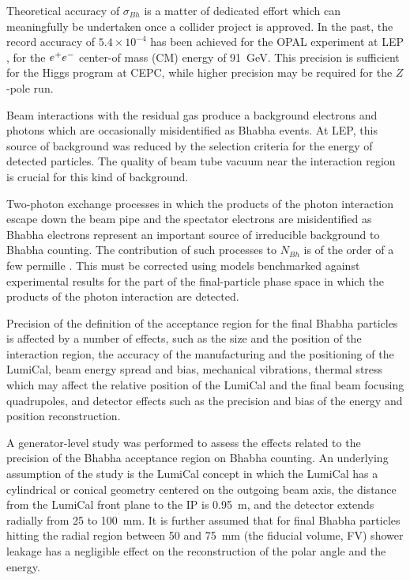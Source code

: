 Theoretical accuracy of $\sigma_{Bh}$ is a matter of dedicated effort which can meaningfully be undertaken once a collider project is approved. In the past, the record accuracy of $5.4\times10^{-4}$ has been achieved for the OPAL experiment at LEP \cite{opal2000}, for the $e^+ e^-$ center-of mass (CM) energy of 91~GeV. This precision is sufficient for the Higgs program at CEPC, while higher precision may be required for the $Z$-pole run.

Beam interactions with the residual gas produce a background electrons and photons which are occasionally misidentified as Bhabha events. At LEP, this source of background was reduced by the selection criteria for the energy of detected particles. The quality of beam tube vacuum near the interaction region is crucial for this kind of background.

Two-photon exchange processes in which the products of the photon interaction escape down the beam pipe and the spectator electrons are misidentified as Bhabha electrons represent an important source of irreducible background to Bhabha counting. The contribution of such processes to $N_{Bh}$ is of the order of a few permille \cite{Boz13}. This must be corrected using models benchmarked against experimental results for the part of the final-particle phase space in which the products of the photon interaction are detected.

Precision of the definition of the acceptance region for the final Bhabha particles is affected by a number of effects, such as the size and the position of the interaction region, the accuracy of the manufacturing and the positioning of the LumiCal, beam energy spread and bias, mechanical vibrations, thermal stress which may affect the relative position of the LumiCal and the final beam focusing quadrupoles, and detector effects such as the precision and bias of the energy and position reconstruction.

A generator-level study was performed to assess the effects related to the precision of the Bhabha acceptance region on Bhabha counting. An underlying assumption of the study is the LumiCal concept in which the LumiCal has a cylindrical or conical geometry centered on the outgoing beam axis, the distance from the LumiCal front plane to the IP is 0.95~m, and the detector extends radially from 25 to 100~mm. It is further assumed that for final Bhabha particles hitting the radial region between 50 and 75~mm (the fiducial volume, FV) shower leakage has a negligible effect on the reconstruction of the polar angle and the energy.

